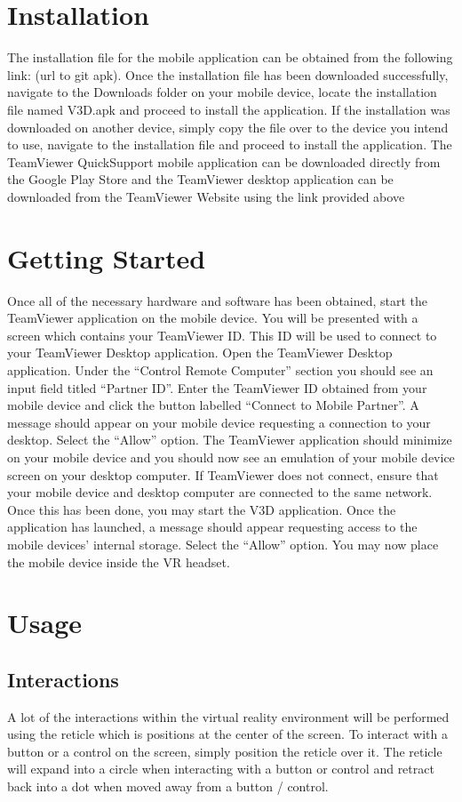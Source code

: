 \documentclass[english]{article}
\begin{document}
\section{Installation}
The installation file for the mobile application can be obtained from the following link: (url to git apk). Once the installation file has been downloaded successfully, navigate to the Downloads folder on your mobile device, locate the installation file named V3D.apk and proceed to install the application. If the installation was downloaded on another device, simply copy the file over to the device you intend to use, navigate to the installation file and proceed to install the application. The TeamViewer QuickSupport mobile application can be downloaded directly from the Google Play Store and the TeamViewer desktop application can be downloaded from the TeamViewer Website using the link provided above 
 
\section{Getting Started}
Once all of the necessary hardware and software has been obtained, start the TeamViewer application on the mobile device. You will be presented with a screen which contains your TeamViewer ID. This ID will be used to connect to your TeamViewer Desktop application. Open the TeamViewer Desktop application. Under the “Control Remote Computer” section you should see an input field titled “Partner ID”. Enter the TeamViewer ID obtained from your mobile device and click the button labelled “Connect to Mobile Partner”. A message should appear on your mobile device requesting a connection to your desktop. Select the “Allow” option. The TeamViewer application should minimize on your mobile device and you should now see an emulation of your mobile device screen on your desktop computer. If TeamViewer does not connect, ensure that your mobile device and desktop computer are connected to the same network. Once this has been done, you may start the V3D application. Once the application has launched, a message should appear requesting access to the mobile devices’ internal storage. Select the “Allow” option. You may now place the mobile device inside the VR headset.

\section{Usage} 
\subsection{Interactions}
A lot of the interactions within the virtual reality environment will be performed using the reticle which is positions at the center of the screen. To interact with a button or a control on the screen, simply position the reticle over it. The reticle will expand into a circle when interacting with a button or control and retract back into a dot when moved away from a button / control.
\end{document}
